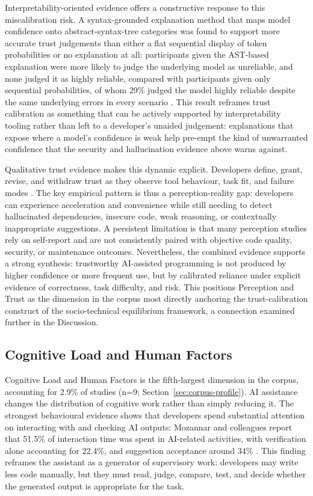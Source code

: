 Interpretability-oriented evidence offers a constructive response to this miscalibration risk. A syntax-grounded explanation method that maps model confidence onto abstract-syntax-tree categories was found to support more accurate trust judgements than either a flat sequential display of token probabilities or no explanation at all: participants given the AST-based explanation were more likely to judge the underlying model as unreliable, and none judged it as highly reliable, compared with participants given only sequential probabilities, of whom 29\% judged the model highly reliable despite the same underlying errors in every scenario \cite{palacio_towards_2025}. This result reframes trust calibration as something that can be actively supported by interpretability tooling rather than left to a developer's unaided judgement: explanations that expose where a model's confidence is weak help pre-empt the kind of unwarranted confidence that the security and hallucination evidence above warns against.

Qualitative trust evidence makes this dynamic explicit. Developers define, grant, revise, and withdraw trust as they observe tool behaviour, task fit, and failure modes \cite{sabouri_trust_2025}. The key empirical pattern is thus a perception-reality gap: developers can experience acceleration and convenience while still needing to detect hallucinated dependencies, insecure code, weak reasoning, or contextually inappropriate suggestions. A persistent limitation is that many perception studies rely on self-report and are not consistently paired with objective code quality, security, or maintenance outcomes. Nevertheless, the combined evidence supports a strong synthesis: trustworthy AI-assisted programming is not produced by higher confidence or more frequent use, but by calibrated reliance under explicit evidence of correctness, task difficulty, and risk. This positions Perception and Trust as the dimension in the corpus most directly anchoring the trust-calibration construct of the socio-technical equilibrium framework, a connection examined further in the Discussion.

\subsection{Cognitive Load and Human Factors}
\label{sec:cognitive-load}
Cognitive Load and Human Factors is the fifth-largest dimension in the corpus, accounting for 2.9\% of studies (n=9; Section~\ref{sec:corpus-profile}). AI assistance changes the distribution of cognitive work rather than simply reducing it. The strongest behavioural evidence shows that developers spend substantial attention on interacting with and checking AI outputs: Mozannar and colleagues report that 51.5\% of interaction time was spent in AI-related activities, with verification alone accounting for 22.4\%, and suggestion acceptance around 34\% \cite{mozannar_reading_2024}. This finding reframes the assistant as a generator of supervisory work: developers may write less code manually, but they must read, judge, compare, test, and decide whether the generated output is appropriate for the task.

